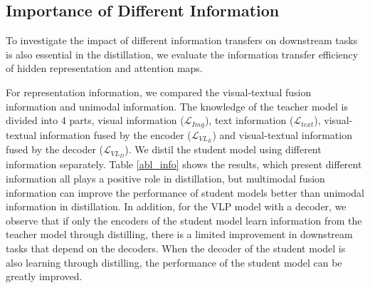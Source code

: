 \documentclass[10pt,twocolumn,letterpaper]{article}
\begin{document}
\subsection{Importance of Different Information}
To investigate the impact of different information transfers on downstream tasks is also essential in the distillation, we evaluate the information transfer efficiency of hidden representation and attention maps.

For representation information, we compared the visual-textual fusion information and unimodal information. 
The knowledge of the teacher model is divided into 4 parts, visual information (\textbf{$\mathcal{L}_{Img}$}), text information (\textbf{$\mathcal{L}_{text}$}), visual-textual information fused by the encoder (\textbf{$\mathcal{L}_{VL_E}$}) and visual-textual information fused by the decoder (\textbf{$\mathcal{L}_{VL_D}$}).
We distil the student model using different information separately. 
Table \ref{abl_info} shows the results, which present different information all plays a positive role in distillation, but multimodal fusion information can improve the performance of student models better than unimodal information in distillation.
In addition, for the VLP model with a decoder, we observe that if only the encoders of the student model learn information from the teacher model through distilling, there is a limited improvement in downstream tasks that depend on the decoders. 
When the decoder of the student model is also learning through distilling, the performance of the student model can be greatly improved.
\end{document}

